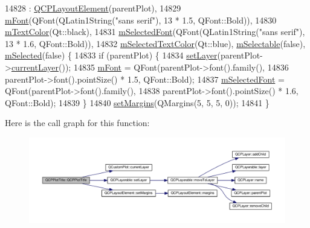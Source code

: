 \begin{DoxyCode}
14828     : \hyperlink{class_q_c_p_layout_element_a8947f0ada17e672aaba3d424cbbb67e3}{QCPLayoutElement}(parentPlot),
14829       \hyperlink{class_q_c_p_plot_title_ad9e2c2a2e941f3444cb692a51df0df62}{mFont}(QFont(QLatin1String(\textcolor{stringliteral}{"sans serif"}), 13 * 1.5, QFont::Bold)),
14830       \hyperlink{class_q_c_p_plot_title_a5d7f834d6522c1a72fb0682c0b7ebe13}{mTextColor}(Qt::black),
14831       \hyperlink{class_q_c_p_plot_title_a95003186c39bbab902873a8ef4cbb547}{mSelectedFont}(QFont(QLatin1String(\textcolor{stringliteral}{"sans serif"}), 13 * 1.6, QFont::Bold)),
14832       \hyperlink{class_q_c_p_plot_title_a8b9760e62af92814c4effdd7ad69c5f9}{mSelectedTextColor}(Qt::blue), \hyperlink{class_q_c_p_plot_title_aadefb5e2b19b1cc7deda0a55ec747884}{mSelectable}(\textcolor{keyword}{false}), 
      \hyperlink{class_q_c_p_plot_title_afef1342a20f5ca985a20b9cfdc03d815}{mSelected}(\textcolor{keyword}{false}) \{
14833   \textcolor{keywordflow}{if} (parentPlot) \{
14834     \hyperlink{class_q_c_p_layerable_ab0d0da6d2de45a118886d2c8e16d5a54}{setLayer}(parentPlot->\hyperlink{class_q_custom_plot_af73057345656cbd1463454982d808b00}{currentLayer}());
14835     \hyperlink{class_q_c_p_plot_title_ad9e2c2a2e941f3444cb692a51df0df62}{mFont} = QFont(parentPlot->font().family(),
14836                   parentPlot->font().pointSize() * 1.5, QFont::Bold);
14837     \hyperlink{class_q_c_p_plot_title_a95003186c39bbab902873a8ef4cbb547}{mSelectedFont} = QFont(parentPlot->font().family(),
14838                           parentPlot->font().pointSize() * 1.6, QFont::Bold);
14839   \}
14840   \hyperlink{class_q_c_p_layout_element_a8f450b1f3f992ad576fce2c63d8b79cf}{setMargins}(QMargins(5, 5, 5, 0));
14841 \}
\end{DoxyCode}


Here is the call graph for this function\+:\nopagebreak
\begin{figure}[H]
\begin{center}
\leavevmode
\includegraphics[width=350pt]{class_q_c_p_plot_title_aaae17bee2de6d6a1e695f76fb1abed03_cgraph}
\end{center}
\end{figure}


